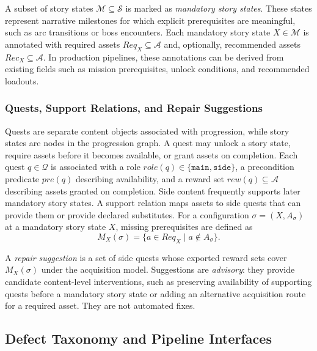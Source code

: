 \documentclass[conference]{IEEEtran}
\newcommand{\States}{\mathcal{S}}
\newcommand{\Assets}{\mathcal{A}}
\newcommand{\Quests}{\mathcal{Q}}
\begin{document}
A subset of story states $\mathcal{M} \subseteq \States$ is marked as
\emph{mandatory story states}. These states represent narrative
milestones for which explicit prerequisites are meaningful, such as arc
transitions or boss encounters. Each mandatory story state
$X \in \mathcal{M}$ is annotated with required assets
$\mathit{Req}_X \subseteq \Assets$ and, optionally, recommended assets
$\mathit{Rec}_X \subseteq \Assets$. In production pipelines, these
annotations can be derived from existing fields such as mission
prerequisites, unlock conditions, and recommended loadouts.

\subsubsection{Quests, Support Relations, and Repair Suggestions}

Quests are separate content objects associated with progression, while
story states are nodes in the progression graph. A quest may unlock a
story state, require assets before it becomes available, or grant assets
on completion. Each quest $q \in \Quests$ is associated with a role
$\mathit{role}(q)\in\{\texttt{main},\texttt{side}\}$, a precondition
predicate $\mathit{pre}(q)$ describing availability, and a reward set
$\mathit{rew}(q)\subseteq\Assets$ describing assets granted on
completion.
Side content frequently supports later mandatory story states. A support
relation maps assets to side quests that can provide them or provide
declared substitutes. For a configuration $\sigma=(X,A_\sigma)$ at a
mandatory story state $X$, missing prerequisites are defined as
\begin{equation}
M_X(\sigma) = \{ a \in \mathit{Req}_X \mid a \notin A_\sigma \}.
\end{equation}

A \emph{repair suggestion} is a set of side quests whose exported reward
sets cover $M_X(\sigma)$ under the acquisition model. Suggestions are
\emph{advisory}: they provide candidate content-level interventions,
such as preserving availability of supporting quests before a mandatory
story state or adding an alternative acquisition route for a required
asset. They are not automated fixes.

\subsection{Defect Taxonomy and Pipeline Interfaces}
\label{sec:taxonomy-and-interfaces}
\end{document}
